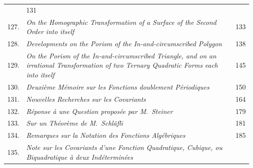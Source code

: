 \documentclass[11pt]{article}
\begin{document}
\begin{longtable}{@{}r p{} r@{}}
\hspace{1em}{\footnotesize Phil.\ Mag.\ t.\ vii.\ (1854), pp.\ 408---409} & 131 \\
127. & \emph{On the Homographic Transformation of a Surface of the Second Order into itself} \dotfill \par
\hspace{1em}{\footnotesize Phil.\ Mag.\ t.\ vii.\ (1854), pp.\ 208---212: continuation of 122} & 133 \\
128. & \emph{Developments on the Porism of the In-and-circumscribed Polygon} \dotfill \par
\hspace{1em}{\footnotesize Phil.\ Mag.\ t.\ vii.\ (1854), pp.\ 339---345} & 138 \\
129. & \emph{On the Porism of the In-and-circumscribed Triangle, and on an irrational Transformation of two Ternary Quadratic Forms each into itself} \dotfill \par
\hspace{1em}{\footnotesize Phil.\ Mag.\ t.\ ix.\ (1855), pp.\ 513---517} & 145 \\
130. & \emph{Deuxi\`{e}me M\'{e}moire sur les Fonctions doublement P\'{e}riodiques} \dotfill \par
\hspace{1em}{\footnotesize Liouville, t.\ xix.\ (1854), pp.\ 193---208: sequel to 25} & 150 \\
131. & \emph{Nouvelles Recherches sur les Covariants} \dotfill \par
\hspace{1em}{\footnotesize Crelle, t.\ xlvii.\ (1854), pp.\ 109---125} & 164 \\
132. & \emph{R\'{e}ponse \`{a} une Question propos\'{e}e par M.\ Steiner} \dotfill \par
\hspace{1em}{\footnotesize Crelle, t.\ l.\ (1855), pp.\ 277---278} & 179 \\
133. & \emph{Sur un Th\'{e}or\`{e}me de M.\ Schl\"{a}fli} \dotfill \par
\hspace{1em}{\footnotesize Crelle, t.\ l.\ (1855), pp.\ 278---282} & 181 \\
134. & \emph{Remarques sur la Notation des Fonctions Alg\'{e}briques} \dotfill \par
\hspace{1em}{\footnotesize Crelle, t.\ l.\ (1855), pp.\ 282---285} & 185 \\
135. & \emph{Note sur les Covariants d'une Fonction Quadratique, Cubique, ou Biquadratique \`{a} deux Ind\'{e}termin\'{e}es} \dotfill \par

\end{longtable}
\end{document}
